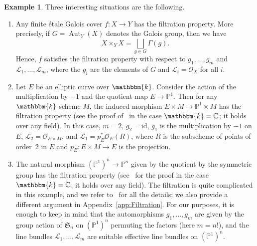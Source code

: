 \documentclass[11pt, reqno]{amsart}
\numberwithin{equation}{section}
\theoremstyle{plain}
\theoremstyle{remark}
\theoremstyle{definition}
\newtheorem{example}[theorem]{Example}
\theoremstyle{italicsname}
\newcommand{\id}{\mathrm{id}}
\DeclareMathOperator{\Aut}{Aut}
\newcommand{\cO}{\mathcal{O}}
\newcommand{\cL}{\mathcal{L}}
\newcommand{\fS}{\mathfrak{S}}
\newcommand{\KK}{\mathbbm{k}}
\def\CC{\ensuremath{\mathbb{C}}}
\def\PP{\ensuremath{\mathbb{P}}}
\begin{document}
\begin{example}\label{ex:PushForward}
Three interesting situations are the following.
\begin{enumerate}
\item\label{enum:etale} Any finite \'etale Galois cover $f \colon X \to Y$ has the filtration property. 
More precisely, if $G = \Aut_Y(X)$ denotes the Galois group, then we have 
\begin{equation*}
    X \times_Y X = \bigsqcup_{g \in G} \Gamma(g). 
\end{equation*}
Hence, $f$ satisfies the filtration property with respect to $g_1, \dots,  g_m$ and $\cL_1, \dots, \cL_m$, where the $g_i$ are the elements of $G$ and $\cL_i = \cO_X$ for all $i$. 

\item\label{enum:ProductElliptic} Let $E$ be an elliptic curve over $\KK$. Consider the action of the multiplication by $-1$ and the quotient map $E\to\PP^1$. Then for any $\KK$-scheme $M$, the induced morphism $E\times M\to\PP^1\times M$ has the filtration property (see the proof of~\cite[Lemma 6.1]{chunyi-stability} in the case $\KK=\CC$; it holds over any field). In this case, $m=2$, $g_2=\id$, $g_1$ is the multiplication by $-1$ on $E$, $\cL_2=\cO_{E\times M}$, and $\cL_1=p_E^*\cO_E(R)$, where $R$ is the subscheme of points of order~2 in $E$ and $p_E\colon E\times M\to E$ is the projection.

\item\label{enum:ProductP1} The natural morphism $(\PP^1)^n\to\PP^n$ given by the quotient by the symmetric group has the filtration property (see~\cite[Corollary 4.2]{chunyi-stability} for the proof in the case $\KK=\CC$; it holds over any field). The filtration is quite complicated in this example, and we refer to~\cite[Section 4]{chunyi-stability} for all the details; we also provide a different argument  in Appendix~\ref{app:Filtration}.
For our purposes, it is enough to keep in mind that the automorphisms $g_1,\dots,g_m$ are given by the group action of $\fS_n$ on $(\PP^1)^n$ permuting the factors (here $m=n!$), and the line bundles $\cL_1,\dots,\cL_m$ are suitable effective line bundles on $(\PP^1)^n$.
\end{enumerate}
\end{example}
\end{document}
